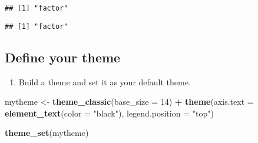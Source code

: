 \documentclass[]{article}
\newenvironment{Shaded}{\begin{snugshade}}{\end{snugshade}}
\newcommand{\KeywordTok}[1]{\textcolor[rgb]{0.13,0.29,0.53}{\textbf{#1}}}
\newcommand{\DataTypeTok}[1]{\textcolor[rgb]{0.13,0.29,0.53}{#1}}
\newcommand{\DecValTok}[1]{\textcolor[rgb]{0.00,0.00,0.81}{#1}}
\newcommand{\StringTok}[1]{\textcolor[rgb]{0.31,0.60,0.02}{#1}}
\newcommand{\OperatorTok}[1]{\textcolor[rgb]{0.81,0.36,0.00}{\textbf{#1}}}
\newcommand{\NormalTok}[1]{#1}
\providecommand{\tightlist}{%
  \setlength{\itemsep}{0pt}\setlength{\parskip}{0pt}}
\begin{document}
\begin{verbatim}
## [1] "factor"
\end{verbatim}

\begin{Shaded}
\end{Shaded}

\begin{verbatim}
## [1] "factor"
\end{verbatim}

\begin{Shaded}
\end{Shaded}

\subsection{Define your theme}\label{define-your-theme}

\begin{enumerate}
\def\labelenumi{\arabic{enumi}.}
\setcounter{enumi}{2}
\tightlist
\item
  Build a theme and set it as your default theme.
\end{enumerate}

\begin{Shaded}
\begin{Highlighting}[]
\NormalTok{mytheme <-}\StringTok{ }\KeywordTok{theme_classic}\NormalTok{(}\DataTypeTok{base_size =} \DecValTok{14}\NormalTok{) }\OperatorTok{+}
\StringTok{  }\KeywordTok{theme}\NormalTok{(}\DataTypeTok{axis.text =} \KeywordTok{element_text}\NormalTok{(}\DataTypeTok{color =} \StringTok{"black"}\NormalTok{), }
        \DataTypeTok{legend.position =} \StringTok{"top"}\NormalTok{)}

\KeywordTok{theme_set}\NormalTok{(mytheme)}
\end{Highlighting}
\end{Shaded}
\end{document}
